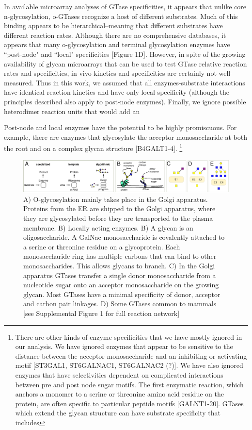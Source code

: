 \documentclass[twocolumn]{article}
\begin{document}
In available microarray analyses of GTase specificities, it appears that unlike core n-glycosylation, o-GTases recognize a host of different substrates. Much of this binding appears to be hierarchical--meaning that different substrates have different reaction rates. Although there are no comprehensive databases, it appears that many o-glycosylation and terminal glycosylation enzymes have ``post-node" and ``local" specificities [Figure 1D]. However, in spite of the growing availability of glycan microarrays that can be used to test GTase relative reaction rates and specificities, in vivo kinetics and specificities are certainly not well-measured. Thus in this work, we assumed that all enzymes-substrate interactions have identical reaction kinetics and have only local specificity (although the principles described also apply to post-node enzymes). Finally, we ignore possible heterodimer reaction units that would add an


Post-node and local enzymes have the potential to be highly promiscuous. For example, there are enzymes that glycosylate the acceptor monosaccharide at both the root and on a complex glycan structure [B4GALT1-4].  \footnote{There are other kinds of enzyme specificities that we have mostly ignored in our analysis. We have ignored enzymes that appear to be sensitive to the distance between the acceptor monosaccharide and an inhibiting or activating motif  [ST3GAL1, ST6GALNAC1, ST6GALNAC2 (?)]. We have also ignored enzymes that have selectivities dependent on complicated interactions between pre and post node sugar motifs. The first enzymatic reaction, which anchors a monomer to a serine or threonine amino acid residue on the protein, are often specific to particular peptide motifs [GALNT1-20]. GTases which extend the glycan structure can have substrate specificity that includes }








\begin{figure}
    \includegraphics[width=\textwidth]{Figure_1.pdf}
	\caption{A) O-glycosylation mainly takes place in the Golgi apparatus. Proteins from the ER are shipped to the Golgi apparatus, where they are glycosylated before they are transported to the plasma membrane.  B) Locally acting enzymes. B) A glycan is an oligosaccharide. A GalNac monosaccharide is covalently attached to a serine or threonine residue on a glycoprotein. Each monosaccharide ring has multiple carbons that can bind to other monosaccharides. This allows glycans to branch. C) In the Golgi apparatus GTases transfer a single donor monosaccharide from a nucleotide sugar onto an acceptor monosaccharide on the growing glycan. Most GTases have a minimal specificity of donor, acceptor and carbon pair linkages. D) Some GTases common to mammals [see Supplemental Figure 1 for full reaction network]}
\end{figure}
\end{document}
